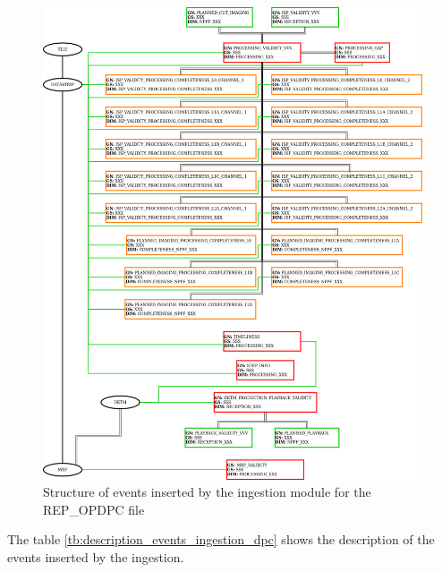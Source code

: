 \begin{figure}[H]
  \begin{center}
	\centering\includegraphics[width=150mm]{../fig/structure_ingestion_dpc.png}
	\caption{Structure of events inserted by the ingestion module for the REP\_OPDPC file}
	\label{fg:structure_ingestion_dpc}
  \end{center}
\end{figure}

The table \ref{tb:description_events_ingestion_dpc} shows the description of the events inserted by the ingestion.

